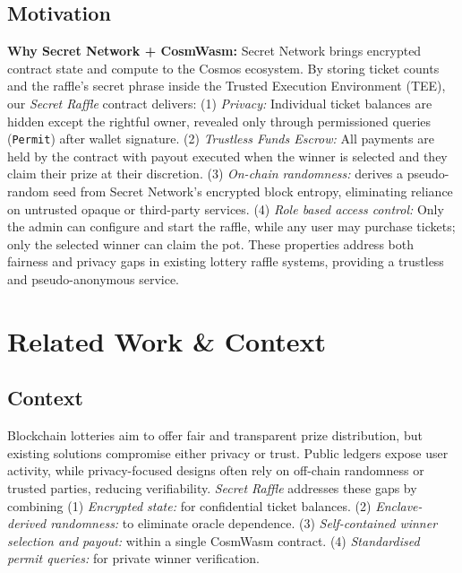 \documentclass[8pt]{extarticle}
\begin{document}
\subsection{Motivation}
\textbf{Why Secret Network + CosmWasm:} Secret Network brings encrypted contract state and compute to the Cosmos ecosystem. By storing ticket counts and the raffle's secret phrase inside the Trusted Execution Environment (TEE), our \emph{Secret Raffle} contract delivers: (1) \emph{Privacy:} Individual ticket balances are hidden except the rightful owner, revealed only through permissioned queries (\texttt{Permit}) after wallet signature. (2) \emph{Trustless Funds Escrow:} All payments are held by the contract with payout executed when the winner is selected and they claim their prize at their discretion. (3) \emph{On-chain randomness:} derives a pseudo-random seed from Secret Network's encrypted block entropy, eliminating reliance on untrusted opaque or third-party services. (4) \emph{Role based access control:} Only the admin can configure and start the raffle, while any user may purchase tickets; only the selected winner can claim the pot. These properties address both fairness and privacy gaps in existing lottery raffle systems, providing a trustless and pseudo-anonymous service.

\section{Related Work \& Context}
\subsection{Context}
Blockchain lotteries aim to offer fair and transparent prize distribution, but existing solutions compromise either privacy or trust. Public ledgers expose user activity, while privacy-focused designs often rely on off-chain randomness or trusted parties, reducing verifiability. \emph{Secret Raffle} addresses these gaps by combining (1) \emph{Encrypted state:} for confidential ticket balances. (2) \emph{Enclave-derived randomness:} to eliminate oracle dependence. (3) \emph{Self-contained winner selection and payout:} within a single CosmWasm contract. (4) \emph{Standardised permit queries:} for private winner verification.
\end{document}
